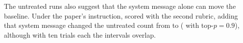 The untreated runs also suggest that the system message alone can move the
baseline. Under the paper's instruction, scored with the second rubric,
adding that system message changed the untreated count from
\CEBridgeNoSystem{} to \CEBridgeSDKFull{} (\CEBridgeSDKNucleus{} with
top-$p=0.9$), although with ten trials each the intervals overlap.

